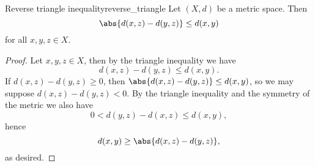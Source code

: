 \begin{proposition}{Reverse triangle inequality}{reverse_triangle}
    Let \((X, d)\) be a metric space. Then
    \begin{equation*}
        \abs{d(x,z) - d(y,z)} \leq d(x,y)
    \end{equation*}
    for all \(x,y,z \in X\).
\end{proposition}
\begin{proof}
    Let \(x,y,z \in X\), then by the triangle inequality we have
    \begin{equation*}
        d(x,z) - d(y,z) \leq d(x,y).
    \end{equation*}
    If \(d(x,z) - d(y,z) \geq 0\), then \(\abs{d(x,z) - d(y,z)} \leq d(x,y)\), so we may suppose \(d(x,z) - d(y,z) < 0\). By the triangle inequality and the symmetry of the metric we also have
    \begin{equation*}
        0 < d(y,z) - d(x, z) \leq d(x,y),
    \end{equation*}
    hence
    \begin{equation*}
        d(x,y) \geq \abs{d(x,z) - d(y,z)},
    \end{equation*}
    as desired.
\end{proof}

